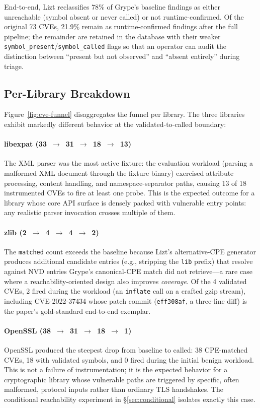 \documentclass[conference]{IEEEtran}
\begin{document}
End-to-end, Lizt reclassifies 78\% of Grype's baseline findings as either unreachable (symbol absent or never called) or not runtime-confirmed.
Of the original 73 CVEs, 21.9\% remain as runtime-confirmed findings after the full pipeline; the remainder are retained in the database with their weaker \texttt{symbol\_present}/\texttt{symbol\_called} flags so that an operator can audit the distinction between ``present but not observed'' and ``absent entirely'' during triage.

\subsection{Per-Library Breakdown}

Figure~\ref{fig:cve-funnel} disaggregates the funnel per library.
The three libraries exhibit markedly different behavior at the validated-to-called boundary:

\paragraph{libexpat (33~$\to$~31~$\to$~18~$\to$~13)}
The XML parser was the most active fixture: the evaluation workload (parsing a malformed XML document through the fixture binary) exercised attribute processing, content handling, and namespace-separator paths, causing 13 of 18 instrumented CVEs to fire at least one probe.
This is the expected outcome for a library whose core API surface is densely packed with vulnerable entry points: any realistic parser invocation crosses multiple of them.

\paragraph{zlib (2~$\to$~4~$\to$~4~$\to$~2)}
The \texttt{matched} count exceeds the baseline because Lizt's alternative-CPE generator produces additional candidate entries (e.g., stripping the \texttt{lib} prefix) that resolve against NVD entries Grype's canonical-CPE match did not retrieve---a rare case where a reachability-oriented design also improves \emph{coverage}.
Of the 4 validated CVEs, 2 fired during the workload (an \texttt{inflate} call on a crafted gzip stream), including CVE-2022-37434 whose patch commit (\texttt{eff308af}, a three-line diff) is the paper's gold-standard end-to-end exemplar.

\paragraph{OpenSSL (38~$\to$~31~$\to$~18~$\to$~1)}
OpenSSL produced the steepest drop from baseline to called: 38 CPE-matched CVEs, 18 with validated symbols, and 0 fired during the initial benign workload.
This is not a failure of instrumentation; it is the expected behavior for a cryptographic library whose vulnerable paths are triggered by specific, often malformed, protocol inputs rather than ordinary TLS handshakes.
The conditional reachability experiment in \S\ref{sec:conditional} isolates exactly this case.
\end{document}

